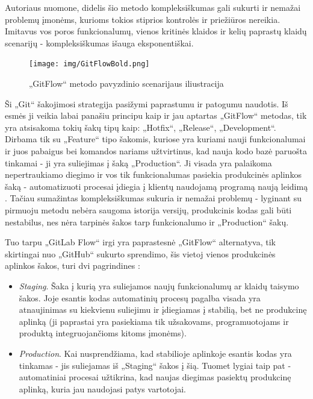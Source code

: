 \documentclass{VUMIFPSkursinis}
\begin{document}
Autoriaus nuomone, didelis šio metodo kompleksiškumas gali sukurti ir nemažai problemų įmonėms, kurioms tokios stiprios kontrolės ir priežiūros nereikia. Imitavus vos poros funkcionalumų, vienos kritinės klaidos ir kelių paprastų klaidų scenarijų - kompleksiškumas išauga eksponentiškai.

\begin{figure}[H]
    \centering
    \texttt{[image: img/GitFlowBold.png]}
    \caption{„GitFlow“ metodo pavyzdinio scenarijaus iliustracija}
    \label{img:mlp}
\end{figure}


Ši „Git“ šakojimosi strategija pasižymi paprastumu ir patogumu naudotis. Iš esmės ji veikia labai panašiu principu kaip ir jau aptartas „GitFlow“ metodas, tik yra atsisakoma tokių šakų tipų kaip: „Hotfix“, „Release“, „Development“. Dirbama tik su „Feature“ tipo šakomis, kuriose yra kuriami nauji funkcionalumai ir juos pabaigus bei komandos nariams užtvirtinus, kad nauja kodo bazė paruošta tinkamai - ji yra suliejimas į šaką „Production“. Ji visada yra palaikoma nepertraukiamo diegimo ir vos tik funkcionalumas pasiekia produkcinės aplinkos šaką - automatizuoti procesai įdiegia į klientų naudojamą programą naują leidimą \cite{SaltDevintas}. Tačiau sumažintas kompleksiškumas sukuria ir nemažai problemų - lyginant su pirmuoju metodu nebėra saugoma istorija versijų, produkcinis kodas gali būti nestabilus, nes nėra tarpinės šakos tarp funkcionalumo ir „Production“ šakų.

Tuo tarpu „GitLab Flow“ irgi yra paprastesnė „GitFlow“ alternatyva, tik skirtingai nuo „GitHub“ sukurto sprendimo, šis vietoj vienos produkcinės aplinkos šakos, turi dvi pagrindines \cite{SaltDesimtas}:

\begin{itemize}
  \item \textit{Staging}. Šaka į kurią yra suliejamos naujų funkcionalumų ar klaidų taisymo šakos. Joje esantis kodas automatinių procesų pagalba visada yra atnaujinimas su kiekvienu suliejimu ir įdiegiamas į stabilią, bet ne produkcinę aplinką (ji paprastai yra pasiekiama tik užsakovams, programuotojams ir produktą integruojančioms kitoms įmonėms).
  
  \item \textit{Production}. Kai nusprendžiama, kad stabilioje aplinkoje esantis kodas yra tinkamas - jis suliejamas iš „Staging“ šakos į šią. Tuomet lygiai taip pat - automatiniai procesai užtikrina, kad naujas diegimas pasiektų produkcinę aplinką, kuria jau naudojasi patys vartotojai.

\end{itemize}
\end{document}
